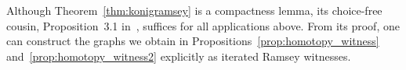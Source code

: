 \documentclass[oneside]{amsart}
\begin{document}
\begin{remark}
    Although Theorem~\ref{thm:konigramsey} is a compactness lemma, its choice-free cousin, Proposition~3.1 in~\cite{Hadek_konig:ramsey}, suffices for all applications above. From its proof, one can construct the graphs we obtain in Propositions~\ref{prop:homotopy_witness} and~\ref{prop:homotopy_witness2} explicitly as iterated Ramsey witnesses. 
\end{remark}






\end{document}
